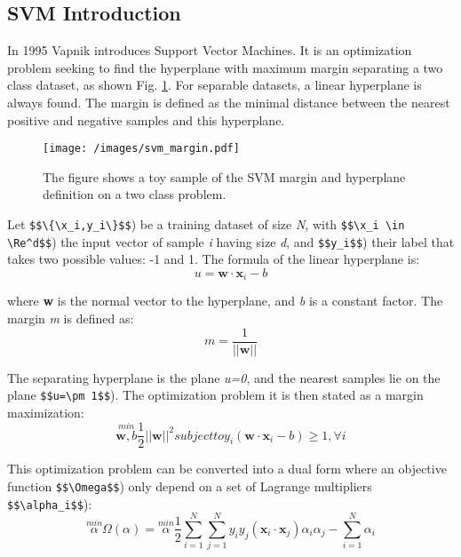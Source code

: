 \documentclass{ipol}
\def\x{{\mathbf x}}
\def\w{{\mathbf w}}
\begin{document}
\subsection{SVM Introduction}

In 1995 Vapnik \cite{Vapnik:1995} introduces Support Vector Machines.
It is an optimization problem seeking to find the hyperplane with maximum margin separating a two class dataset, as shown Fig. \ref{fig:svm_margin}.
For separable datasets, a linear hyperplane is always found.
The margin is defined as the minimal distance between the nearest positive and negative samples and this hyperplane.

\begin{figure}[!h]
\begin{center}
\texttt{[image: /images/svm\_margin.pdf]}
\caption{The figure shows a toy sample of the SVM margin and hyperplane definition on a two class problem.}
\label{fig:svm_margin}
\end{center}
\end{figure}

Let \verb|$$\{\x_i,y_i\}$$|) be a training dataset of size \textit{N}, with \verb|$$\x_i \in \Re^d$$|) the input vector of sample \textit{i} having size \textit{d}, and \verb|$$y_i$$|) their label that takes two possible values: -1 and 1.
The formula of the linear hyperplane is:
\begin{equation}
u = \w \cdot \x_i - b
\end{equation}

\noindent where \textbf{w} is the normal vector to the hyperplane, and \textit{b} is a constant factor.
The margin \textit{m} is defined as:
\begin{equation}
m = \frac{1}{||\w||}
\end{equation}

The separating hyperplane is the plane \textit{u=0}, and the nearest samples lie on the plane \verb|$$u=\pm 1$$|).
The optimization problem it is then stated as a margin maximization:
\begin{equation}
\stackrel{min}{\w,b} \frac{1}{2} ||\w||^2 subject to y_i(\w \cdot \x_i - b) \geq 1, \forall i
\end{equation}

This optimization problem can be converted into a dual form where an objective function \verb|$$\Omega$$|) only depend on a set of Lagrange multipliers \verb|$$\alpha_i$$|):
\begin{equation}
\stackrel{min}{\alpha} \Omega(\alpha) = \stackrel{min}{\alpha} \frac{1}{2} \sum_{i=1}^N \sum_{j=1}^N y_i y_j (\x_i \cdot \x_j) \alpha_i \alpha_j - \sum_{i=1}^N \alpha_i
\end{equation}
\end{document}
